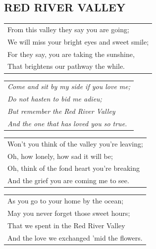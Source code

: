 \documentclass[a4paper, 14pt]{extarticle}
\begin{document}
\subsection*{RED RIVER VALLEY}
\begin{flushleft}
\begin{tabularx}{\textwidth} {
    >{\raggedright\arraybackslash}X}
From this valley they say you are going;\\
We will miss your bright eyes and sweet smile;\\
For they say, you are taking the sunshine,\\
That brightens our pathway the while.\\
\end{tabularx}
\end{flushleft}
\begin{flushleft}
\begin{tabularx}{\textwidth} {
    >{\raggedright\arraybackslash}X}
\textit{Come and sit by my side if you love me;}\\
\textit{Do not hasten to bid me adieu;}\\
\textit{But remember the Red River Valley}\\
\textit{And the one that has loved you so true.}\\
\end{tabularx}
\end{flushleft}
\begin{flushleft}
\begin{tabularx}{\textwidth} {
    >{\raggedright\arraybackslash}X}
Won’t you think of the valley you’re leaving;\\
Oh, how lonely, how sad it will be;\\
Oh, think of the fond heart you’re breaking\\
And the grief you are coming me to see.\\
\end{tabularx}
\end{flushleft}
\begin{flushleft}
\begin{tabularx}{\textwidth} {
    >{\raggedright\arraybackslash}X}
As you go to your home by the ocean;\\
May you never forget those sweet hours;\\
That we spent in the Red River Valley\\
And the love we exchanged ’mid the flowers.\\
\end{tabularx}
\end{flushleft}
\end{document}
